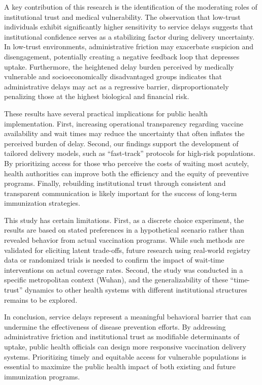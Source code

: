 \documentclass[preprint,12pt,authoryear]{elsarticle}
\begin{document}
A key contribution of this research is the identification of the moderating roles of institutional trust and medical vulnerability. The observation that low-trust individuals exhibit significantly higher sensitivity to service delays suggests that institutional confidence serves as a stabilizing factor during delivery uncertainty. In low-trust environments, administrative friction may exacerbate suspicion and disengagement, potentially creating a negative feedback loop that depresses uptake. Furthermore, the heightened delay burden perceived by medically vulnerable and socioeconomically disadvantaged groups indicates that administrative delays may act as a regressive barrier, disproportionately penalizing those at the highest biological and financial risk.

These results have several practical implications for public health implementation. First, increasing operational transparency regarding vaccine availability and wait times may reduce the uncertainty that often inflates the perceived burden of delay. Second, our findings support the development of tailored delivery models, such as ``fast-track'' protocols for high-risk populations. By prioritizing access for those who perceive the costs of waiting most acutely, health authorities can improve both the efficiency and the equity of preventive programs. Finally, rebuilding institutional trust through consistent and transparent communication is likely important for the success of long-term immunization strategies.

This study has certain limitations. First, as a discrete choice experiment, the results are based on stated preferences in a hypothetical scenario rather than revealed behavior from actual vaccination programs. While such methods are validated for eliciting latent trade-offs, future research using real-world registry data or randomized trials is needed to confirm the impact of wait-time interventions on actual coverage rates. Second, the study was conducted in a specific metropolitan context (Wuhan), and the generalizability of these ``time-trust'' dynamics to other health systems with different institutional structures remains to be explored.

In conclusion, service delays represent a meaningful behavioral barrier that can undermine the effectiveness of disease prevention efforts. By addressing administrative friction and institutional trust as modifiable determinants of uptake, public health officials can design more responsive vaccination delivery systems. Prioritizing timely and equitable access for vulnerable populations is essential to maximize the public health impact of both existing and future immunization programs.
\end{document}
